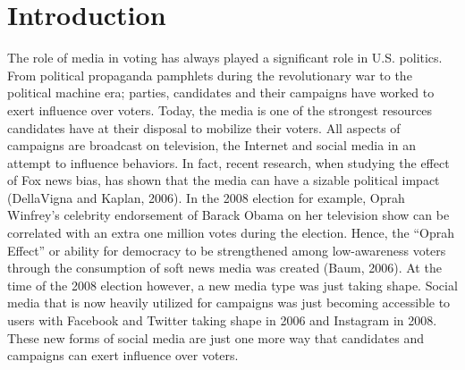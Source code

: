 \documentclass[11pt,]{article}
\begin{document}
\vskip 6.5pt

\noindent  \section{Introduction}\label{introduction}

The role of media in voting has always played a significant role in U.S.
politics. From political propaganda pamphlets during the revolutionary
war to the political machine era; parties, candidates and their
campaigns have worked to exert influence over voters. Today, the media
is one of the strongest resources candidates have at their disposal to
mobilize their voters. All aspects of campaigns are broadcast on
television, the Internet and social media in an attempt to influence
behaviors. In fact, recent research, when studying the effect of Fox
news bias, has shown that the media can have a sizable political impact
(DellaVigna and Kaplan, 2006). In the 2008 election for example, Oprah
Winfrey's celebrity endorsement of Barack Obama on her television show
can be correlated with an extra one million votes during the election.
Hence, the ``Oprah Effect'' or ability for democracy to be strengthened
among low-awareness voters through the consumption of soft news media
was created (Baum, 2006). At the time of the 2008 election however, a
new media type was just taking shape. Social media that is now heavily
utilized for campaigns was just becoming accessible to users with
Facebook and Twitter taking shape in 2006 and Instagram in 2008. These
new forms of social media are just one more way that candidates and
campaigns can exert influence over voters.
\end{document}
